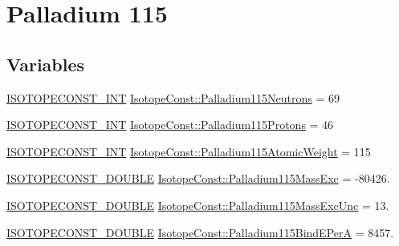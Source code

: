 \hypertarget{group___isotope_const-_palladium-_pd115}{}\section{Palladium 115}
\label{group___isotope_const-_palladium-_pd115}
\subsection*{Variables}
\begin{DoxyCompactItemize}
\item 
\mbox{\hyperlink{group___isotope_const-_macros_ga5f18360b3e99483a35c32d789e62621c}{I\+S\+O\+T\+O\+P\+E\+C\+O\+N\+S\+T\+\_\+\+I\+NT}} \mbox{\hyperlink{group___isotope_const-_palladium-_pd115_ga2c344c4f7470ba7d6ef86de83cc3efc4}{Isotope\+Const\+::\+Palladium115\+Neutrons}} = 69
\item 
\mbox{\hyperlink{group___isotope_const-_macros_ga5f18360b3e99483a35c32d789e62621c}{I\+S\+O\+T\+O\+P\+E\+C\+O\+N\+S\+T\+\_\+\+I\+NT}} \mbox{\hyperlink{group___isotope_const-_palladium-_pd115_gaad151e44b35d363348e445b7c3e1e2ce}{Isotope\+Const\+::\+Palladium115\+Protons}} = 46
\item 
\mbox{\hyperlink{group___isotope_const-_macros_ga5f18360b3e99483a35c32d789e62621c}{I\+S\+O\+T\+O\+P\+E\+C\+O\+N\+S\+T\+\_\+\+I\+NT}} \mbox{\hyperlink{group___isotope_const-_palladium-_pd115_gad5930dedb01efd71dc91b7cc0858603d}{Isotope\+Const\+::\+Palladium115\+Atomic\+Weight}} = 115
\item 
\mbox{\hyperlink{group___isotope_const-_macros_ga8f45a7272ce02c0b4c65c44636ed719a}{I\+S\+O\+T\+O\+P\+E\+C\+O\+N\+S\+T\+\_\+\+D\+O\+U\+B\+LE}} \mbox{\hyperlink{group___isotope_const-_palladium-_pd115_gabce4a6614e5a139ded079cd894850a21}{Isotope\+Const\+::\+Palladium115\+Mass\+Exc}} = -\/80426.
\item 
\mbox{\hyperlink{group___isotope_const-_macros_ga8f45a7272ce02c0b4c65c44636ed719a}{I\+S\+O\+T\+O\+P\+E\+C\+O\+N\+S\+T\+\_\+\+D\+O\+U\+B\+LE}} \mbox{\hyperlink{group___isotope_const-_palladium-_pd115_gaf7d3c430d15873a2eb8c1fc117e1fec5}{Isotope\+Const\+::\+Palladium115\+Mass\+Exc\+Unc}} = 13.
\item 
\mbox{\hyperlink{group___isotope_const-_macros_ga8f45a7272ce02c0b4c65c44636ed719a}{I\+S\+O\+T\+O\+P\+E\+C\+O\+N\+S\+T\+\_\+\+D\+O\+U\+B\+LE}} \mbox{\hyperlink{group___isotope_const-_palladium-_pd115_gac4741e1e8f3a8c9a393b36ab8017c527}{Isotope\+Const\+::\+Palladium115\+Bind\+E\+PerA}} = 8457.
\item 

\end{DoxyCompactItemize}
